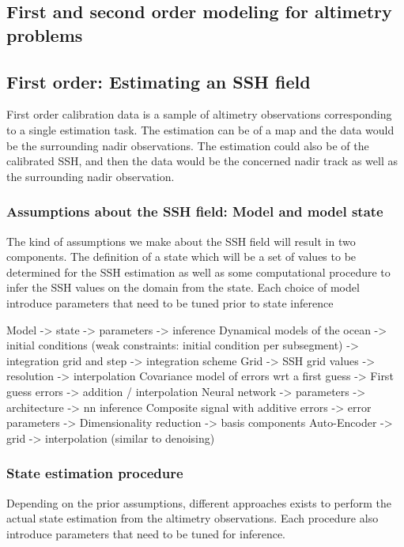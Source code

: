 \begin{bibunit}

  \chapter*{First and second order modeling for altimetry problems}

  \section{First order: Estimating an SSH field}

  First order calibration data is a sample of altimetry observations corresponding to a single estimation task.
  The estimation can be of a map and the data would be the surrounding nadir observations.
  The estimation could also be of the calibrated SSH, and then the data would be the concerned nadir track as well as the surrounding nadir observation.

  \subsection{Assumptions about the SSH field: Model and model state}
  The kind of assumptions we make about the SSH field will result in two components.
  The definition of a state which will be a set of values to be determined for the SSH estimation as well as some computational procedure to infer the SSH values on the domain from the state.
  Each choice of model introduce parameters that need to be tuned prior to state inference

  Model -> state -> parameters -> inference
  Dynamical models of the ocean -> initial conditions (weak constraints: initial condition per subsegment) -> integration grid and step -> integration scheme
  Grid -> SSH grid values -> resolution -> interpolation
  Covariance model of errors wrt a first guess -> First guess errors -> addition / interpolation
  Neural network -> parameters -> architecture -> nn inference
  Composite signal with additive errors -> error parameters -> 
  Dimensionality reduction -> basis components
  Auto-Encoder -> grid -> interpolation (similar to denoising)


  \subsection{State estimation procedure}
    Depending on the prior assumptions, different approaches exists to perform the actual state estimation from the altimetry observations.
    Each procedure also introduce parameters that need to be tuned for inference.


\end{bibunit}
